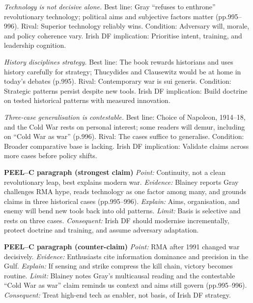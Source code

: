 \textit{Technology is not decisive alone.} Best line: Gray “refuses to enthrone” revolutionary technology; political aims and subjective factors matter (pp.995–996). Rival: Superior technology reliably wins. Condition: Adversary will, morale, and policy coherence vary. Irish DF implication: Prioritise intent, training, and leadership cognition.

\textit{History disciplines strategy.} Best line: The book rewards historians and uses history carefully for strategy; Thucydides and Clausewitz would be at home in today’s debates (p.995). Rival: Contemporary war is sui generis. Condition: Strategic patterns persist despite new tools. Irish DF implication: Build doctrine on tested historical patterns with measured innovation.

\textit{Three-case generalisation is contestable.} Best line: Choice of Napoleon, 1914–18, and the Cold War rests on personal interest; some readers will demur, including on “Cold War as war” (p.996). Rival: The cases suffice to generalise. Condition: Broader comparative base is lacking. Irish DF implication: Validate claims across more cases before policy shifts.

\textbf{PEEL–C paragraph (strongest claim)}
\textit{Point:} Continuity, not a clean revolutionary leap, best explains modern war.
\textit{Evidence:} Blainey reports Gray challenges RMA hype, reads technology as one factor among many, and grounds claims in three historical cases (pp.995–996).
\textit{Explain:} Aims, organisation, and enemy will bend new tools back into old patterns.
\textit{Limit:} Basis is selective and rests on three cases.
\textit{Consequent:} Irish DF should modernise incrementally, protect doctrine and training, and assume adversary adaptation.

\textbf{PEEL–C paragraph (counter-claim)}
\textit{Point:} RMA after 1991 changed war decisively.
\textit{Evidence:} Enthusiasts cite information dominance and precision in the Gulf.
\textit{Explain:} If sensing and strike compress the kill chain, victory becomes routine.
\textit{Limit:} Blainey notes Gray’s multicausal reading and the contestable “Cold War as war” claim reminds us context and aims still govern (pp.995–996).
\textit{Consequent:} Treat high-end tech as enabler, not basis, of Irish DF strategy.

